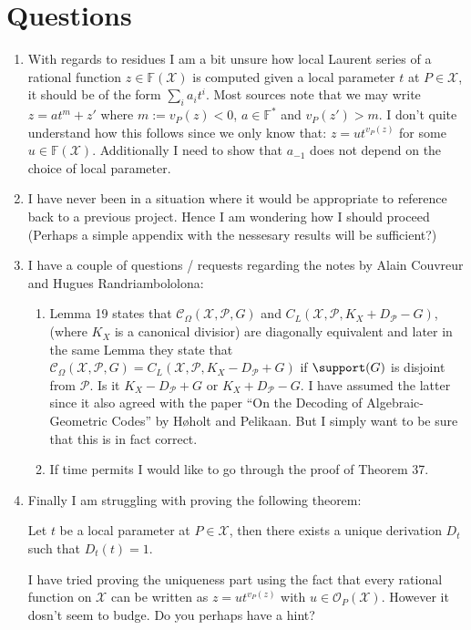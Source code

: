 \chapter*{Questions}

\begin{enumerate}
  \item With regards to residues I am a bit unsure how local Laurent series of a rational function $z \in \mathbb{F}(\mathcal{X})$ is computed given a local parameter $t$ at $P \in \mathcal{X}$, it should be of the form $\sum_i a_i t^i$. Most sources note that we may write $z = at^m + z'$ where $m := v_P(z) < 0$, $a \in \mathbb{F}^{*}$ and $v_P(z') > m$. I don't quite understand how this follows since we only know that: $z = ut^{v_P(z)}$ for some $u \in \mathbb{F}(\mathcal{X})$. Additionally I need to show that $a_{-1}$ does not depend on the choice of local parameter.
  \item I have never been in a situation where it would be appropriate to reference back to a previous project. Hence I am wondering how I should proceed (Perhaps a simple appendix with the nessesary results will be sufficient?)
  \item I have a couple of questions / requests regarding the notes by Alain Couvreur and Hugues Randriambololona:
  \begin{enumerate}
    \item Lemma 19 states that $\mathcal{C}_{\Omega}(\mathcal{X}, \mathcal{P}, G)$ and $C_L(\mathcal{X}, \mathcal{P}, K_X + D_{\mathcal{P}} - G)$, (where $K_X$ is a canonical divisior) are diagonally equivalent and later in the same Lemma they state that $\mathcal{C}_{\Omega}(\mathcal{X}, \mathcal{P}, G) = C_L(\mathcal{X}, \mathcal{P}, K_X - D_{\mathcal{P}} + G)$ if $\support(G)$ is disjoint from $\mathcal{P}$. Is it $K_X - D_{\mathcal{P}} + G$ or  $K_X + D_{\mathcal{P}} - G$. I have assumed the latter since it also agreed with the paper ``On the Decoding of Algebraic-Geometric Codes'' by Høholt and Pelikaan. But I simply want to be sure that this is in fact correct.
    \item If time permits I would like to go through the proof of Theorem 37.
  \end{enumerate}
  \item Finally I am struggling with proving the following theorem:
    \begin{theorem}
      Let $t$ be a local parameter at $P \in \mathcal{X}$, then there exists a unique derivation $D_t$ such that $D_t(t) = 1$.
    \end{theorem}
    I have tried proving the uniqueness part using the fact that every rational function on $\mathcal{X}$ can be written as $z = ut^{v_P(z)}$ with $u \in \mathcal{O}_P(\mathcal{X})$. However it dosn't seem to budge. Do you perhaps have a hint?
\end{enumerate}
